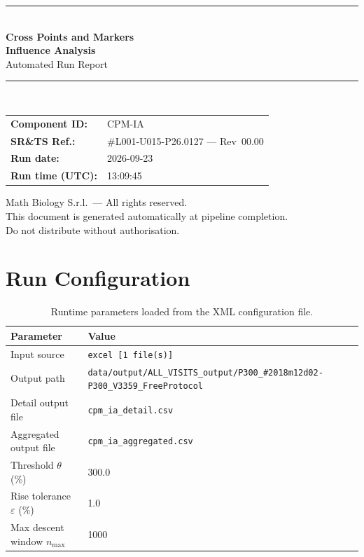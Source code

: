 \documentclass[a4paper,11pt]{article}
\begin{document}
\begin{titlepage}
\begin{center}
  \vspace*{1.8cm}
  {\color{dmaaccent}\rule{\linewidth}{1.5pt}}\\[0.6cm]
  {\LARGE\bfseries\color{dmaaccent}
    Cross Points and Markers\\[0.25cm]
    Influence Analysis}\\[0.4cm]
  {\Large Automated Run Report}\\[0.3cm]
  {\color{dmaaccent}\rule{\linewidth}{1.5pt}}\\[2cm]

  \begin{tabular}{ll}
    \textbf{Component ID:}   & CPM-IA \\[0.3cm]
    \textbf{SR\&TS Ref.:}    & \#L001-U015-P26.0127 --- Rev~00.00 \\[0.3cm]
    \textbf{Run date:}       & 2026-09-23 \\[0.3cm]
    \textbf{Run time (UTC):} & 13:09:45 \\
  \end{tabular}

  \vfill
  {\color{dmagray}\small
    Math Biology S.r.l.\ --- All rights reserved.\\
    This document is generated automatically at pipeline completion.\\
    Do not distribute without authorisation.}
\end{center}
\end{titlepage}

\tableofcontents
\clearpage

\section{Run Configuration}

\begin{table}[h!]
\centering
\small
\caption{Runtime parameters loaded from the XML configuration file.}
\begin{tabular}{ll}
\toprule
\textbf{Parameter} & \textbf{Value} \\
\midrule
Input source                      & \texttt{excel [1 file(s)]} \\
Output path                       & \texttt{data/output/ALL\_VISITS\_output/P300\_\#2018m12d02-P300\_V3359\_FreeProtocol} \\
Detail output file                & \texttt{cpm\_ia\_detail.csv} \\
Aggregated output file            & \texttt{cpm\_ia\_aggregated.csv} \\
Threshold $\theta$ (\%)           & 300.0 \\
Rise tolerance $\varepsilon$ (\%) & 1.0 \\
Max descent window $n_{\max}$     & 1000 \\
\bottomrule
\end{tabular}
\end{table}
\end{document}
